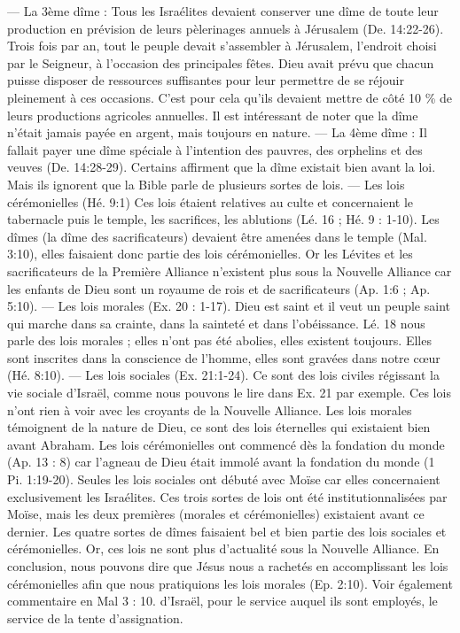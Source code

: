 \begin{multicols}{2}
{— La 3ème dîme : Tous les Israélites devaient conserver une dîme de toute leur production en prévision de leurs pèlerinages annuels à Jérusalem (De. 14:22-26).
Trois fois par an, tout le peuple devait s'assembler à Jérusalem, l'endroit choisi par le Seigneur, à l'occasion des principales fêtes. Dieu avait prévu que chacun puisse disposer de ressources suffisantes pour leur permettre de se réjouir pleinement à ces occasions. C'est pour cela qu'ils devaient mettre de côté 10 \% de leurs productions agricoles annuelles. Il est intéressant de noter que la dîme n'était jamais payée en argent, mais toujours en nature.
— La 4ème dîme : Il fallait payer une dîme spéciale à l'intention des pauvres, des orphelins et des veuves (De. 14:28-29). 
Certains affirment que la dîme existait bien avant la loi. Mais ils ignorent que la Bible parle de plusieurs sortes de lois.
— Les lois cérémonielles (Hé. 9:1)
Ces lois étaient relatives au culte et concernaient le tabernacle puis le temple, les sacrifices, les ablutions (Lé. 16 ; Hé. 9 : 1-10). Les dîmes (la dîme des sacrificateurs) devaient être amenées dans le temple (Mal. 3:10), elles faisaient donc partie des lois cérémonielles. Or les Lévites et les sacrificateurs de la Première Alliance n'existent plus sous la Nouvelle Alliance car les enfants de Dieu sont un royaume de rois et de sacrificateurs (Ap. 1:6 ; Ap. 5:10).
— Les lois morales (Ex. 20 : 1-17). Dieu est saint et il veut un peuple saint qui marche dans sa crainte, dans la sainteté et dans l'obéissance. Lé. 18 nous parle des lois morales ; elles n'ont pas été abolies, elles existent toujours. Elles sont inscrites dans la conscience de l'homme, elles sont gravées dans notre cœur (Hé. 8:10).
— Les lois sociales (Ex. 21:1-24). Ce sont des lois civiles régissant la vie sociale d'Israël, comme nous pouvons le lire dans Ex. 21 par exemple. Ces lois n'ont rien à voir avec les croyants de la Nouvelle Alliance. Les lois morales témoignent de la nature de Dieu, ce sont des lois éternelles qui existaient bien avant Abraham. Les lois cérémonielles ont commencé dès la fondation du monde (Ap. 13 : 8) car l'agneau de Dieu était immolé avant la fondation du monde (1 Pi. 1:19-20). Seules les lois sociales ont débuté avec Moïse car elles concernaient exclusivement les Israélites. Ces trois sortes de lois ont été institutionnalisées par Moïse, mais les deux premières (morales et cérémonielles) existaient avant ce dernier. Les quatre sortes de dîmes faisaient bel et bien partie des lois sociales et cérémonielles. Or, ces lois ne sont plus d'actualité sous la Nouvelle Alliance. En conclusion, nous pouvons dire que Jésus nous a rachetés en accomplissant les lois cérémonielles afin que nous pratiquions les lois morales (Ep. 2:10). Voir également commentaire en Mal 3 : 10.} d'Israël, pour le service auquel ils sont employés, le service de la tente d'assignation.

\end{multicols}

